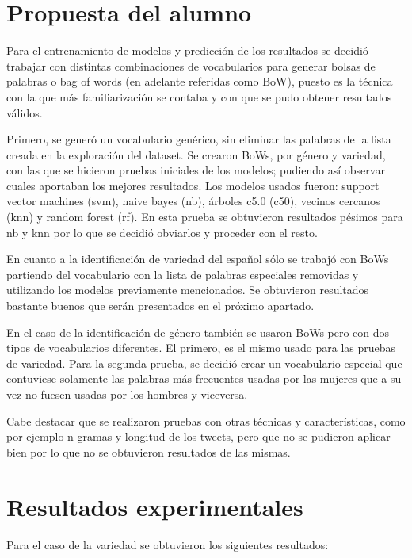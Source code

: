 \documentclass[11pt,a4paper]{article}
\begin{document}
\section{Propuesta del alumno}

Para el entrenamiento de modelos y predicción de los resultados se decidió trabajar con distintas combinaciones de vocabularios para generar bolsas de palabras o bag of words (en adelante referidas como BoW), puesto es la técnica con la que más familiarización se contaba y con que se pudo obtener resultados válidos.

Primero, se generó un vocabulario genérico, sin eliminar las palabras de la lista creada en la exploración del dataset. Se crearon BoWs, por género y variedad, con las que se hicieron pruebas iniciales de los modelos; pudiendo así observar cuales aportaban los mejores resultados. Los modelos usados fueron: support vector machines (svm), naive bayes (nb), árboles c5.0 (c50), vecinos cercanos (knn) y random forest (rf). En esta prueba se obtuvieron resultados pésimos para nb y knn por lo que se decidió obviarlos y proceder con el resto.

En cuanto a la identificación de variedad del español sólo se trabajó con BoWs partiendo del vocabulario con la lista de palabras especiales removidas y utilizando los modelos previamente mencionados. Se obtuvieron resultados bastante buenos que serán presentados en el próximo apartado.

En el caso de la identificación de género también se usaron BoWs pero con dos tipos de vocabularios diferentes. El primero, es el mismo usado para las pruebas de variedad. Para la segunda prueba, se decidió crear un vocabulario especial que contuviese solamente las palabras más frecuentes usadas por las mujeres que a su vez no fuesen usadas por los hombres y viceversa. 

Cabe destacar que se realizaron pruebas con otras técnicas y características, como por ejemplo n-gramas y longitud de los tweets, pero que no se pudieron aplicar bien por lo que no se obtuvieron resultados de las mismas.

\section{Resultados experimentales}

Para el caso de la variedad se obtuvieron los siguientes resultados:
\end{document}
